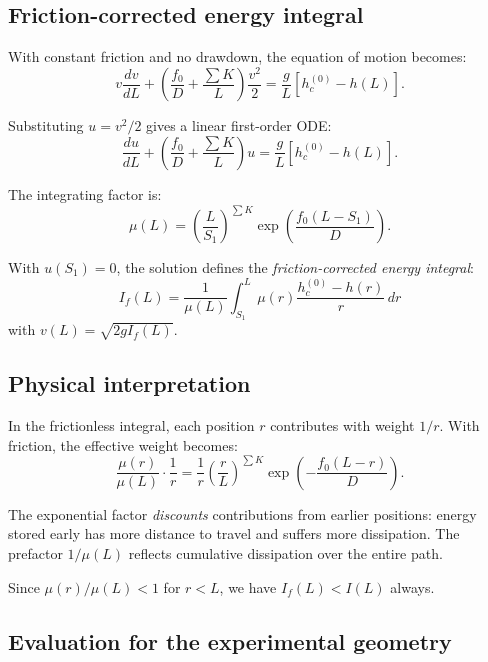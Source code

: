 \documentclass[11pt]{article}
\begin{document}
\subsection{Friction-corrected energy integral}

With constant friction and no drawdown, the equation of motion becomes:
\[
  v \frac{dv}{dL} + \left(\frac{f_0}{D} + \frac{\sum K}{L}\right) \frac{v^2}{2} = \frac{g}{L}[h_c^{(0)} - h(L)].
\]

Substituting $u = v^2/2$ gives a linear first-order ODE:
\begin{equation}
  \frac{du}{dL} + \left(\frac{f_0}{D} + \frac{\sum K}{L}\right) u = \frac{g}{L}[h_c^{(0)} - h(L)].
  \label{eq:u-ODE}
\end{equation}

The integrating factor is:
\begin{equation}
  \mu(L) = \left(\frac{L}{S_1}\right)^{\sum K} \exp\left(\frac{f_0(L - S_1)}{D}\right).
  \label{eq:integrating-factor}
\end{equation}

With $u(S_1) = 0$, the solution defines the \emph{friction-corrected energy integral}:
\begin{equation}
  \boxed{I_f(L) = \frac{1}{\mu(L)} \int_{S_1}^{L} \mu(r) \frac{h_c^{(0)} - h(r)}{r} \, dr}
  \label{eq:I-f-def}
\end{equation}
with $v(L) = \sqrt{2gI_f(L)}$.

\subsection{Physical interpretation}

In the frictionless integral, each position $r$ contributes with weight $1/r$. With friction, the effective weight becomes:
\[
  \frac{\mu(r)}{\mu(L)} \cdot \frac{1}{r} = \frac{1}{r}\left(\frac{r}{L}\right)^{\sum K} \exp\left(-\frac{f_0(L-r)}{D}\right).
\]

The exponential factor \emph{discounts} contributions from earlier positions: energy stored early has more distance to travel and suffers more dissipation. The prefactor $1/\mu(L)$ reflects cumulative dissipation over the entire path.

Since $\mu(r)/\mu(L) < 1$ for $r < L$, we have $I_f(L) < I(L)$ always.

\subsection{Evaluation for the experimental geometry}
\end{document}
